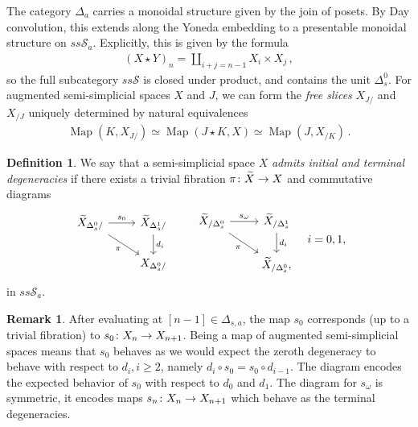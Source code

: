 \documentclass[10pt]{amsart}
\numberwithin{equation}{section}
\theoremstyle{definition}
\newtheorem{definition}[prop]{Definition}
\newtheorem{rem}[prop]{Remark}
\DeclareMathOperator{\Map}{Map}
\newcommand{\Simp}{\mathbb{\Delta}}
\newcommand{\cS}{\mathcal{S}}
\newcommand{\join}{\star}
\renewcommand{\to}{\mathchoice{\longrightarrow}{\rightarrow}{}{}}
\begin{document}
	The category $\Simp_{a}$ carries a monoidal structure given by the join of posets.
  By Day convolution, this extends along the Yoneda embedding to a presentable monoidal structure on $ss\cS_{a}$.
  Explicitly, this is given by the formula
	\begin{align*}
		(X\join Y)_{n} = \coprod_{i+j = n-1} X_{i}\times X_{j} \,,
	\end{align*}
	so the full subcategory $ss\cS$ is closed under product, and contains the unit $\Delta^{0}_{s}$.
  For augmented semi-simplicial spaces $X$ and $J$, we can form the \emph{free slices} $X_{J/}$ and $X_{/J}$ uniquely determined by natural equivalences
	\begin{align*}
		\Map(K, X_{J/}) \simeq \Map(J\join K ,X) \simeq \Map(J, X_{/K}) \,.
	\end{align*}

	\begin{definition}\label{def:outer_degeneracies}
		We say that a semi-simplicial space $X$ \emph{admits initial and terminal degeneracies} if there exists a trivial fibration $\pi \colon \widetilde{X} \to X$ and commutative diagrams
		\begin{equation*}
			\begin{tikzcd}
				\widetilde{X}_{\Delta_{s}^{0}/} \arrow[r, "s_0"] \arrow[dr, "\pi"']      &   \widetilde{X}_{\Delta_{s}^{1}/}  \arrow[d, "d_i"] \\
				&   X_{\Delta_{s}^{0}/}
			\end{tikzcd}
			\qquad
			\begin{tikzcd}
				\widetilde{X}_{/\Delta_{s}^{0}} \arrow[r, "s_{\omega}"] \arrow[dr, "\pi"']      &   \widetilde{X}_{/\Delta_{s}^{1}}  \arrow[d, "d_i"] \\
				&   \widetilde{X}_{/\Delta_{s}^{0}},
			\end{tikzcd}
			\quad i=0,1,
		\end{equation*}
		in $ss\cS_{a}$.
	\end{definition}

	\begin{rem}\label{rem:unpacking_outer_degeneracies}
		After evaluating at $[n-1]\in \Simp_{s,a}$, the map $s_{0}$ corresponds (up to a trivial fibration) to $s_{0}\colon X_{n}\to X_{n+1}$.
    Being a map of augmented semi-simplicial spaces means that $s_{0}$ behaves as we would expect the zeroth degeneracy to behave with respect to $d_{i}, i\geq 2$, namely $d_{i}\circ s_{0} = s_{0}\circ d_{i-1}$.
    The diagram encodes the expected behavior of $s_{0}$ with respect to $d_{0}$ and $d_{1}$. The diagram for $s_{\omega}$ is symmetric, it encodes maps $s_{n}\colon X_{n}\to X_{n+1}$ which behave as the terminal degeneracies.
	\end{rem}
\end{document}
